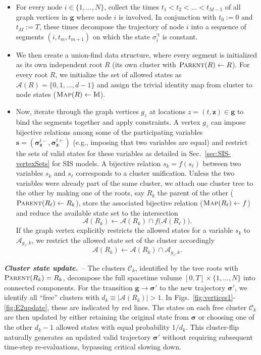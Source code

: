 \documentclass[english,10pt,aps,pra,twocolumn,superscriptaddress,floatfix,fleqn]{revtex4-2}
\newcommand{\mc}[1]{\mathcal{#1}}
\renewcommand{\vec}[1]{{\boldsymbol{#1}}}
\newcommand{\A} {\mc{A}}
\newcommand{\C} {\mc{C}}
\newcommand{\vg}{\vec{g}}
\newcommand{\vs}{\vec{\sigma}}
\newcommand{\vz}{\vec{z}}
\newcommand{\Emph}[1]{\emph{\textbf{#1}}}
\begin{document}
\begin{itemize}
 \item 
 For every node $i\in\{1,\dotsc,N\}$, collect the times $t_1 < t_2 < \dots < t_{M-1}$ of all graph vertices in $\vg$ where node $i$ is involved. In conjunction with $t_0:=0$ and $t_M:=T$, these times decompose the trajectory of node $i$ into a sequence of segments $(i, t_m, t_{m+1})$ on which the state $\sigma^{\prime t}_i$ is constant.
 \item
 We then create a union-find data structure, where every segment is initialized as its own independent root $R$ (its own cluster with $\textsc{Parent}(R)\leftarrow R$). For every root $R$, we initialize the set of allowed states as $\A(R)=\{0,1,\dotsc,d-1\}$ and assign the trivial identity map from cluster to node states ($\textsc{Map}(R)\leftarrow \operatorname{Id}$).
 \item
 Now, iterate through the graph vertices $g_z$ at locations $z=(t,\vz)\in\vg$ to bind the segments together and apply constraints. A vertex $g_z$ can impose bijective relations among some of the participating variables $\vec{s}=(\vs_\vz^{t-},\vs_\vz^{t+})$ (e.g., imposing that two variables are equal) and restrict the sets of valid states for these variables as detailed in Sec.~\ref{sec:SIS-vertexSets} for SIS models. A bijective relation $s_k=f(s_\ell)$ between two variables $s_k$ and $s_\ell$ corresponds to a cluster unification. Unless the two variables were already part of the same cluster, we attach one cluster tree to the other by making one of the roots, say $R_k$ the parent of the other ($\textsc{Parent}(R_\ell)\leftarrow R_k$), store the associated bijective relation ($\textsc{Map}(R_\ell)\leftarrow f$) and reduce the available state set to the intersection
 \begin{equation}
	\A(R_k)\leftarrow \A(R_k)\cap f\big(\A(R_\ell)\big).
 \end{equation}
 If the graph vertex explicitly restricts the allowed states for a variable $s_k$ to $\A_{g_z,k}$, we restrict the allowed state set of the cluster accordingly
 \begin{equation}
	\A(R_k) \leftarrow \A(R_k) \cap \A_{g_z,k}.
 \end{equation}
\end{itemize}

\Emph{Cluster state update.}~--
The clusters $\C_k$, identified by the tree roots with $\textsc{Parent}(R_k)=R_k$, decompose the full spacetime volume $[0,T]\times\{1,\dotsc,N\}$ into connected components. For the transition $\vg \to \vs'$ to the new trajectory $\vs'$, we identify all ``free'' clusters with $d_k\equiv|\A(R_k)|>1$. In Figs.~\ref{fig:vertices1}-\ref{fig:E2update}, these are indicated by red lines. The states on each free cluster $\C_k$ are then updated by either retaining the original state from $\vs$ or choosing one of the other $d_k-1$ allowed states with equal probability $1/d_k$.
This cluster-flip naturally generates an updated valid trajectory $\vs'$ without requiring subsequent time-step re-evaluations, bypassing critical slowing down.
\end{document}

